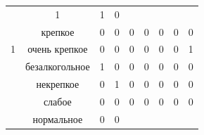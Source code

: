\begin{table}[H]
\begin{center}
\begin{tabular}{|c|c|ccccccc|}
		& \multicolumn{1}{c|}{1}      
		& \multicolumn{1}{c|}{1}        
		& \multicolumn{1}{c|}{0}  \\ \cline{2-9}
		{\color[HTML]{333333} }                                                    & крепкое                              
		& \multicolumn{1}{c|}{{\color[HTML]{333333} 0}} 
		& \multicolumn{1}{c|}{{\color[HTML]{333333} 0}} 
		& \multicolumn{1}{c|}{0}     
		& \multicolumn{1}{c|}{0}      
		& \multicolumn{1}{c|}{0}      
		& \multicolumn{1}{c|}{0}        
		& \multicolumn{1}{c|}{0}  \\ \cline{2-9}
		\multirow{-6}{*}{{\color[HTML]{333333} 1}}                                 & очень крепкое                       
		& \multicolumn{1}{c|}{{\color[HTML]{333333} 0}} 
		& \multicolumn{1}{c|}{{\color[HTML]{333333} 0}} 
		& \multicolumn{1}{c|}{0}     
		& \multicolumn{1}{c|}{0}      
		& \multicolumn{1}{c|}{0}      
		& \multicolumn{1}{c|}{0}        
		& \multicolumn{1}{c|}{1}  \\ \cline{1-9}
		{\color[HTML]{333333} }                                                    & безалкогольное                                 
		& \multicolumn{1}{c|}{1}                        
		& \multicolumn{1}{c|}{0}                        
		& \multicolumn{1}{c|}{0}     
		& \multicolumn{1}{c|}{0}      
		& \multicolumn{1}{c|}{0}      
		& \multicolumn{1}{c|}{0}        
		& \multicolumn{1}{c|}{0}  \\ \cline{2-9}
		{\color[HTML]{333333} }                                                    & некрепкое                           
		& \multicolumn{1}{c|}{{\color[HTML]{333333} 0}} 
		& \multicolumn{1}{c|}{{\color[HTML]{333333} 1}} 
		& \multicolumn{1}{c|}{0}    
		 & \multicolumn{1}{c|}{0}     
		  & \multicolumn{1}{c|}{0}     
		   & \multicolumn{1}{c|}{0}        &      \multicolumn{1}{c|}{0}                 \\ \cline{2-9}
		{\color[HTML]{333333} }                                                    & слабое                          
		 & \multicolumn{1}{c|}{{\color[HTML]{333333} 0}} 
		 & \multicolumn{1}{c|}{{\color[HTML]{333333} 0}} 
		 & \multicolumn{1}{c|}{0}     
		 & \multicolumn{1}{c|}{0}      
		 & \multicolumn{1}{c|}{0}      
		 & \multicolumn{1}{c|}{0}       
		  &            \multicolumn{1}{c|}{0}           \\ \cline{2-9}
		{\color[HTML]{333333} }                                                    & нормальное                                    
		& \multicolumn{1}{c|}{{\color[HTML]{333333} 0}} 
		& \multicolumn{1}{c|}{{\color[HTML]{333333} 0}} 

\end{tabular}
\end{center}
\end{table}
